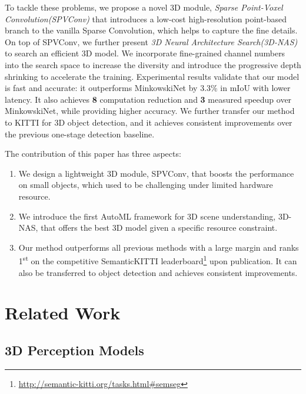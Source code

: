 \documentclass[runningheads]{llncs}
\def\module{Sparse Point-Voxel Convolution\xspace}
\def\moduleshort{SPVConv\xspace}
\def\nas{3D Neural Architecture Search\xspace}
\def\nasshort{3D-NAS\xspace}
\begin{document}
To tackle these problems, we propose a novel 3D module, \emph{\module (\moduleshort)} that introduces a low-cost high-resolution point-based branch to the vanilla Sparse Convolution, which helps to capture the fine details. On top of \moduleshort, we further present \emph{\nas (\nasshort)} to search an efficient 3D model. We incorporate fine-grained channel numbers into the search space to increase the diversity and introduce the progressive depth shrinking to accelerate the training. Experimental results validate that our model is fast and accurate: it outperforms MinkowskiNet by 3.3\% in mIoU with lower latency. It also achieves \textbf{8} computation reduction and \textbf{3} measured speedup over MinkowskiNet, while providing higher accuracy. We further transfer our method to KITTI for 3D object detection, and it achieves consistent improvements over the previous one-stage detection baseline.

The contribution of this paper has three aspects:
\begin{enumerate}
    \item We design a lightweight 3D module, \moduleshort, that boosts the performance on small objects, which used to be challenging under limited hardware resource.
    \item We introduce the first AutoML framework for 3D scene understanding, \nasshort, that offers the best 3D model given a specific resource constraint.
    \item Our method outperforms all previous methods with a large margin and ranks 1\textsuperscript{st} on the competitive SemanticKITTI leaderboard\footnote{\url{http://semantic-kitti.org/tasks.html#semseg}} upon publication. It can also be transferred to object detection and achieves consistent improvements.
\end{enumerate}
 \section{Related Work}

\subsection{3D Perception Models}
\end{document}
